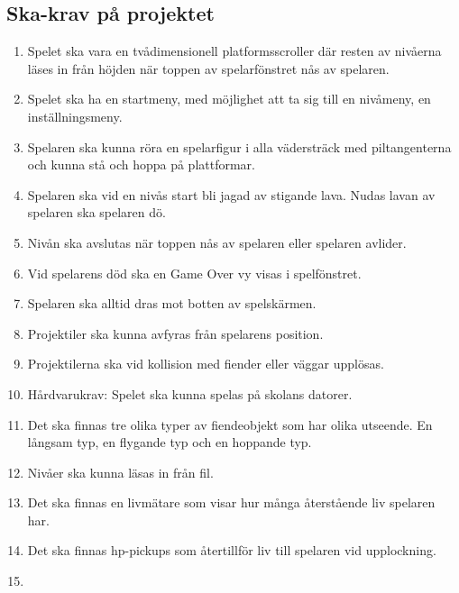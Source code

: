 \documentclass{TDP005mall}
\begin{document}
\subsection{Ska-krav på projektet}
\begin{enumerate}
\item Spelet ska vara en tvådimensionell platformsscroller där resten av nivåerna läses in från höjden när toppen av spelarfönstret nås av spelaren.
\item Spelet ska ha en startmeny, med möjlighet att ta sig till en nivåmeny, en inställningsmeny.
\item Spelaren ska kunna röra en spelarfigur i alla vädersträck med piltangenterna och kunna stå och hoppa på plattformar.
\item Spelaren ska vid en nivås start bli jagad av stigande lava. Nudas lavan av spelaren ska spelaren dö.
\item Nivån ska avslutas när toppen nås av spelaren eller spelaren avlider.
\item Vid spelarens död ska en Game Over vy visas i spelfönstret.
\item Spelaren ska alltid dras mot botten av spelskärmen.
\item Projektiler ska kunna avfyras från spelarens position.
\item Projektilerna ska vid kollision med fiender eller väggar upplösas.
\item Hårdvarukrav: Spelet ska kunna spelas på skolans datorer.
\item Det ska finnas tre olika typer av fiendeobjekt som har olika utseende. En långsam typ, en flygande typ och en hoppande typ.
\item Nivåer ska kunna läsas in från fil.
\item Det ska finnas en livmätare som visar hur många återstående liv spelaren har.
\item Det ska finnas hp-pickups som återtillför liv till spelaren vid upplockning.
\item  

\end{enumerate}
\end{document}
